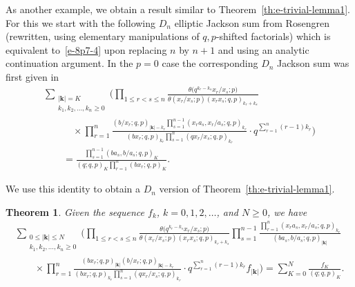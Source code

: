 \documentclass[pdftex]{sigma}
\numberwithin{equation}{section}
\newtheorem{Theorem}{Theorem}[section]
\newcommand\sumk{{\left| \boldsymbol{k} \right|}}
\newcommand{\smallprod}[1]{\prod\limits_{r =1}^{#1}} %
\newcommand{\ellipticqrfac}[2]{{\left({#1}; q, p\right)_{#2}}} %
\begin{document}
As another example, we obtain a result similar to Theorem~\ref{th:e-trivial-lemma1}. For this we start with the following $D_n$ elliptic Jackson sum
from Rosengren~\cite[Theorem~6.1]{HR2004} (rewritten, using elementary manipulations of $q,p$-shifted factorials) which is equivalent to~\eqref{e-8p7-4} upon replacing $n$ by $n+1$ and using an analytic continuation argument. In the $p=0$ case the corresponding $D_n$ Jackson sum was first given in \cite[Theorem~5.17]{MS1997}
\begin{gather*}%
\sum\limits_{\substack{\sumk = K \\
k_1,k_2, \dots, k_n\geq 0} } \Bigg(\prod_{1\le r<s\le n}\frac{\theta\big(q^{k_r-k_s}x_r/x_s;p\big)}
{\theta(x_r/x_s;p)(x_rx_s;q,p)_{k_r+k_s}}\\
 \qquad\quad{} \times \smallprod n \frac{(b/x_r;q,p)_{\sumk-k_r} \prod\limits_{s=1}^{n-1}(x_ra_s,x_r/a_s;q,p)_{k_r}}
{(bx_r;q,p)_{k_r} \prod\limits_{s=1}^n(qx_r/x_s;q,p)_{k_r}}\cdot q^{\sum\limits_{r=1}^n(r-1)k_r}\Bigg)\\
 \qquad{} = \frac{\prod\limits_{s=1}^{n-1}(ba_s,b/a_s;q,p)_K} {(q;q,p)_K\prod\limits_{r=1}^n(bx_r;q,p)_K}.
\end{gather*}

We use this identity to obtain a $D_n$ version of Theorem~\ref{th:e-trivial-lemma1}.

\begin{Theorem}\label{th:e-trivial-lemma1-dn} Given the sequence $f_k$, $k=0,1,2, \dots$, and $N\geq 0$, we have
\begin{gather}
\sum\limits_{\substack{0\leq \sumk \leq N \\
k_1,k_2, \dots, k_n\geq 0} }
\Bigg(
\prod_{1\le r<s\le n}\frac{\theta\big(q^{k_r-k_s}x_r/x_s;p\big)}
{\theta(x_r/x_s;p)(x_rx_s;q,p)_{k_r+k_s}}\prod_{s=1}^{n-1}\frac{
\prod\limits_{r=1}^n(x_ra_s,x_r/a_s;q,p)_{k_r}}
{(ba_s,b/a_s;q,p)_{\sumk}}\nonumber\\
\qquad{} \times
\smallprod n\frac{(bx_r;q,p)_{\sumk}(b/x_r;q,p)_{\sumk-k_r}}
{(bx_r;q,p)_{k_r}\prod\limits_{s=1}^n(qx_r/x_s;q,p)_{k_r}}
\cdot q^{\sum\limits_{r=1}^n(r-1)k_r}
f_{\sumk}\Bigg) =
\sum_{K=0}^N
\frac{f_K}{\ellipticqrfac{q}{K}}.\label{e-trivial-lemma1-dn}
\end{gather}
\end{Theorem}
\end{document}

